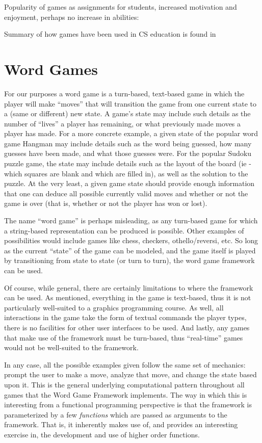 Popularity of games as assignments for students, increased motivation and enjoyment, perhaps no increase in abilities: \cite{Cliburn06, Cliburn08}

Summary of how games have been used in CS education is found in \cite{Cliburn06}

\section{Word Games}
\label{wordGameDefn}

For our purposes a word game is a turn-based, text-based game in which the player will make ``moves'' that will transition the game from one current state to a (same or different) new state.  A game's state may include such details as the number of ``lives'' a player has remaining, or what previously made moves a player has made.  For a more concrete example, a given state of the popular word game Hangman may include details such as the word being guessed, how many guesses have been made, and what those guesses were.  For the popular Sudoku puzzle game, the state may include details such as the layout of the board (ie - which squares are blank and which are filled in), as well as the solution to the puzzle.  At the very least, a given game state should provide enough information that one can deduce all possible currently valid moves and whether or not the game is over (that is, whether or not the player has won or lost).

The name ``word game'' is perhaps misleading, as any turn-based game for which a string-based representation can be produced is possible.  Other examples of possibilities would include games like chess, checkers, othello/reversi, etc.  So long as the current ``state'' of the game can be modeled, and the game itself is played by transitioning from state to state (or turn to turn), the word game framework can be used.

Of course, while general, there are certainly limitations to where the framework can be used.  As mentioned, everything in the game is text-based, thus it is not particularly well-suited to a graphics programming course.  As well, all interactions in the game take the form of textual commands the player types, there is no facilities for other user interfaces to be used.  And lastly, any games that make use of the framework must be turn-based, thus ``real-time'' games would not be well-suited to the framework.

In any case, all the possible examples given follow the same set of mechanics: prompt the user to make a move, analyze that move, and change the state based upon it.  This is the general underlying computational pattern throughout all games that the Word Game Framework implements.  The way in which this is interesting from a functional programming perspective is that the framework is parameterized by a few \emph{functions} which are passed as arguments to the framework.  That is, it inherently makes use of, and provides an interesting exercise in, the development and use of higher order functions.

